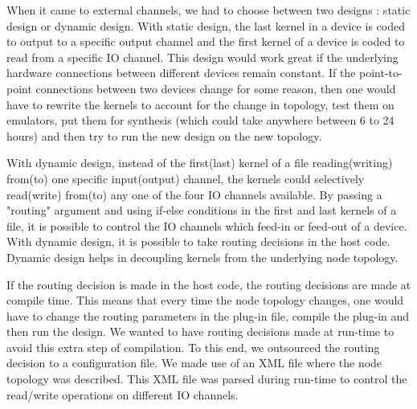 When it came to external channels, we had to choose between two designs : static design or dynamic design. With static design, the last kernel in a device is coded to output to a specific output channel and  the first kernel of a device is coded to read from a specific IO channel. This design would work great if the underlying hardware connections between different devices remain constant. If the point-to-point connections between two devices change for some reason, then one would have to rewrite the kernels to account for the change in topology, test them on emulators, put them for synthesis (which could take anywhere between 6 to 24 hours) and then try to run the new design on the new topology.




With dynamic design, instead of the first(last) kernel of a file reading(writing) from(to) one specific input(output) channel, the kernels could selectively read(write)  from(to) any one of the four IO channels available. By passing a "routing" argument and using if-else conditions in the first and last kernels of a file, it is possible to control the IO channels which feed-in or feed-out of a device. With dynamic design, it is possible to take routing decisions in the host code. Dynamic design helps in decoupling kernels from the underlying node topology.



If the routing decision is made in the host code, the routing decisions are made at compile time. This means that every time the node topology changes, one would have to change the routing parameters in the plug-in file, compile the plug-in and then run the design. We wanted to have routing decisions made at run-time to avoid this extra step of compilation. To this end, we outsourced the routing decision to a configuration file. We made use of an XML file where the node topology was described. This XML file was parsed during run-time to control the read/write operations on different IO channels. 

